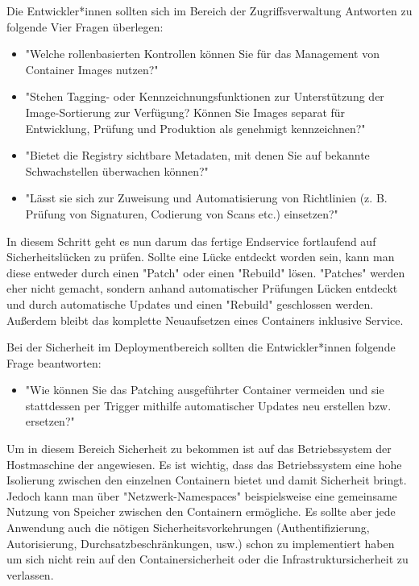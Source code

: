 Die Entwickler*innen sollten sich im Bereich der Zugriffsverwaltung Antworten zu folgende Vier Fragen überlegen:

\begin{itemize}
    \item "Welche rollenbasierten Kontrollen können Sie für das Management von Container Images nutzen?" \cite{ContainerSecurity}
    \item "Stehen Tagging- oder Kennzeichnungsfunktionen zur Unterstützung der Image-Sortierung zur Verfügung? Können Sie Images separat für Entwicklung, Prüfung und Produktion als genehmigt kennzeichnen?" \cite{ContainerSecurity}
    \item "Bietet die Registry sichtbare Metadaten, mit denen Sie auf bekannte Schwachstellen überwachen können?" \cite{ContainerSecurity}
    \item "Lässt sie sich zur Zuweisung und Automatisierung von Richtlinien (z. B. Prüfung von Signaturen, Codierung von Scans etc.) einsetzen?" \cite{ContainerSecurity}
\end{itemize}


In diesem Schritt geht es nun darum das fertige Endservice fortlaufend auf Sicherheitslücken zu prüfen. Sollte eine Lücke entdeckt worden sein, kann man diese entweder durch einen "Patch" oder einen "Rebuild" lösen. "Patches" werden eher nicht gemacht, sondern anhand automatischer Prüfungen Lücken entdeckt und durch automatische Updates und einen "Rebuild" geschlossen werden. Außerdem bleibt das komplette Neuaufsetzen eines Containers inklusive Service. \cite{ContainerSecurity}

Bei der Sicherheit im Deploymentbereich sollten die Entwickler*innen folgende Frage beantworten:

\begin{itemize}
    \item "Wie können Sie das Patching ausgeführter Container vermeiden und sie stattdessen per Trigger mithilfe automatischer Updates neu erstellen bzw. ersetzen?" \cite{ContainerSecurity}
\end{itemize}


Um in diesem Bereich Sicherheit zu bekommen ist auf das Betriebssystem der Hostmaschine der angewiesen. Es ist wichtig, dass das Betriebssystem eine hohe Isolierung zwischen den einzelnen Containern bietet und damit Sicherheit bringt. Jedoch kann man über "Netzwerk-Namespaces" beispielsweise eine gemeinsame Nutzung von Speicher zwischen den Containern ermögliche. Es sollte aber jede Anwendung auch die nötigen Sicherheitsvorkehrungen (Authentifizierung, Autorisierung, Durchsatzbeschränkungen, usw.) schon zu implementiert haben um sich nicht rein auf den Containersicherheit oder die Infrastruktursicherheit zu verlassen.

